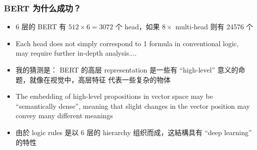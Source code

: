 \documentclass[16pt]{beamer}
\newcommand{\cc}[2]{#1}
\newcommand{\cc}[2]{#2}
\newcommand{\emp}[1]{{\color{violet}#1}}
\begin{document}
\begin{frame}
\frametitle{\cc{BERT 为什么成功？}{Why is BERT so successful?}}
\begin{itemize}
	\item \cc{6 层的 BERT 有 $512 \times 6 = 3072$ 个 head，如果 $8\times$ multi-head 则有 24576 个}
	{The 6-layer BERT has $512 \times 6 = 3072$ heads, or 24576 with $8\times$ multi-head attention}
	
	\item Each head does not simply correspond to 1 formula in conventional logic, may require further in-depth analysis....

	\item \cc{
	我的猜测是： BERT 的高层 representation 是一些有 ``high-level'' 意义的命题，就像在视觉中，高层特征 代表一些复杂的物体}{
	My guess is that the representation in BERT's higher layers are ``high-level'' propositions similar to the high-level features that represent complex objects in machine vision.
	}
	
	\item The embedding of high-level propositions in vector space may be ``semantically dense'', meaning that slight changes in the vector position may convey many different meanings
	
	\item \cc{
	由於 logic rules 是以 6 层的 hierarchy 组织而成，这結構具有 ``\emp{deep learning}'' 的特性}{
	Because logic rules are organized in 6 layers of \emp{hierarchy}, this structure has the ``deep learning'' property
	}
\end{itemize}
\end{frame}
\end{document}
